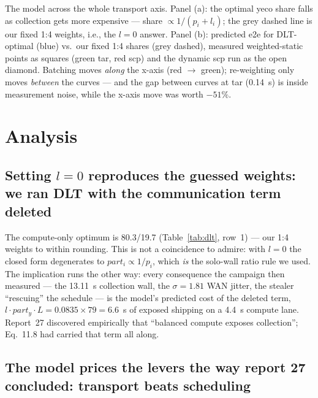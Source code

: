 \documentclass[
	english,
	letterpaper, oneside
]{article}
\begin{document}
            {The model across the whole transport axis. Panel (a): the
             optimal yeco share falls as collection gets more expensive
             --- share $\propto 1/(p_i + l_i)$; the grey dashed line is
             our fixed 1:4 weights, i.e., the $l=0$ answer. Panel (b):
             predicted e2e for DLT-optimal (blue) vs.\ our fixed 1:4
             shares (grey dashed), measured weighted-static points as
             squares (green tar, red scp) and the dynamic scp run as the
             open diamond. Batching moves \emph{along} the x-axis (red
             $\to$ green); re-weighting only moves \emph{between} the
             curves --- and the gap between curves at tar (0.14~s) is
             inside measurement noise, while the x-axis move was worth
             $-51\%$.\label{fig:model}}

\section{Analysis}
\label{sec:analysis}

\subsection{Setting $l=0$ reproduces the guessed weights: we ran DLT with the communication term deleted}
\label{sec:lzero}

The compute-only optimum is 80.3/19.7 (Table~\ref{tab:dlt}, row~1) ---
our 1:4 weights to within rounding. This is not a coincidence to admire:
with $l=0$ the closed form degenerates to
$part_i \propto 1/p_i$, which \emph{is} the solo-wall ratio rule we used.
The implication runs the other way: every consequence the campaign then
measured --- the 13.11~s collection wall, the $\sigma = 1.81$ WAN jitter,
the stealer ``rescuing'' the schedule --- is the model's predicted cost of
the deleted term, $l \cdot part_y \cdot L = 0.0835 \times 79 = 6.6$~s of
exposed shipping on a 4.4~s compute lane. Report~27 discovered
empirically that ``balanced compute exposes collection''; Eq.~11.8 had
carried that term all along.

\subsection{The model prices the levers the way report 27 concluded: transport beats scheduling}
\label{sec:pricing}
\end{document}
